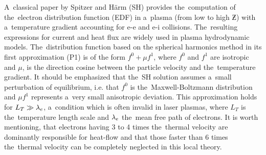 A~classical paper by Spitzer and H\"arm (SH) 
\cite{SpitzerHarm_PR1953} provides the~computation of 
the~electron distribution function (EDF) in a~plasma (from low to high $\Zbar$)
with a~temperature gradient accounting for e-e and e-i collisions.
The~resulting expressions for current and heat flux are widely used in plasma 
hydrodynamic models.
The~distribution function based on the spherical harmonics method in 
its first approximation (P1) \cite{Jeans_MNRAS1917} is of the form 
$f^0+\mu f^1$, where $f^0$ and $f^1$ 
are isotropic and $\mu$, is the direction cosine between the particle 
velocity and the~temperature gradient. It should be emphasized that
the~SH solution assumes a~small perturbation of equilibrium, i.e. that 
$f^0$ is the~Maxwell-Boltzmann distribution and $\mu f^1$ represents 
a~very small anisotropic deviation. 
This approximation holds for $L_T\gg\lambda_e$, 
a~condition which is often invalid in laser plasmas, 
where $L_T$ is the~temperature length scale and $\lambda_e$ 
the~mean free path of electrons. It is worth mentioning, that electrons having
3 to 4 times the~thermal velocity are dominantly responsible for heat-flow
and that those faster than 6 times the~thermal velocity can be completely 
neglected in this local theory.


